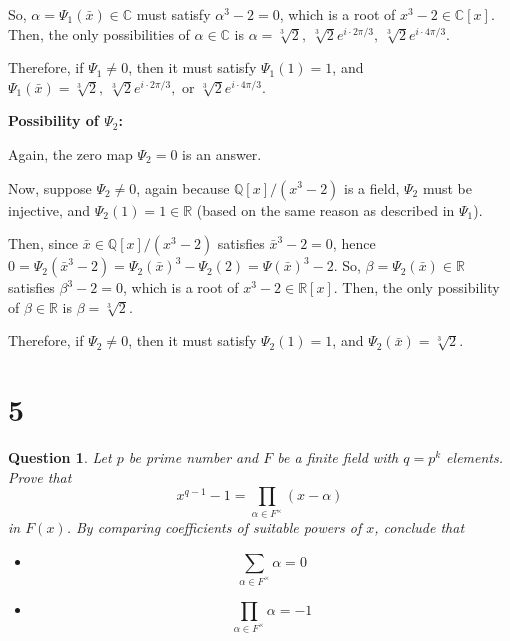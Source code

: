\documentclass{article}
\newtheorem{question}{Question}
\begin{document}
\begin{itemize}
    So, $\alpha=\Psi_1(\bar{x})\in\mathbb{C}$ must satisfy $\alpha^3-2=0$, which is a root of $x^3-2\in\mathbb{C}[x]$. Then, the only possibilities of $\alpha\in \mathbb{C}$ is $\alpha=\sqrt[3]{2},\ \sqrt[3]{2}e^{i\cdot 2\pi/3},\ \sqrt[3]{2}e^{i\cdot 4\pi/3}$.

    Therefore, if $\Psi_1\neq 0$, then it must satisfy $\Psi_1(1)=1$, and $\Psi_1(\bar{x})=\sqrt[3]{2},\ \sqrt[3]{2}e^{i\cdot 2\pi/3},$ or $\sqrt[3]{2}e^{i\cdot 4\pi/3}$.

    \hfil

    \textbf{Possibility of $\Psi_2$:}

    Again, the zero map $\Psi_2=0$ is an answer.

    Now, suppose $\Psi_2\neq 0$, again because $\mathbb{Q}[x]/(x^3-2)$ is a field, $\Psi_2$ must be injective, and $\Psi_2(1)=1\in\mathbb{R}$ (based on the same reason as described in $\Psi_1$).

    Then, since $\bar{x}\in\mathbb{Q}[x]/(x^3-2)$ satisfies $\bar{x}^3-2=0$, hence $0=\Psi_2(\bar{x}^3-2)=\Psi_2(\bar{x})^3-\Psi_2(2)=\Psi(\bar{x})^3-2$.
    So, $\beta=\Psi_2(\bar{x})\in\mathbb{R}$ satisfies $\beta^3-2=0$, which is a root of $x^3-2\in\mathbb{R}[x]$. Then, the only possibility of $\beta\in\mathbb{R}$ is $\beta=\sqrt[3]{2}$.

    Therefore, if $\Psi_2\neq 0$, then it must satisfy $\Psi_2(1)=1$, and $\Psi_2(\bar{x})=\sqrt[3]{2}$.

\end{itemize}

\hfil

\hfil

\section*{5}
\begin{myBox}[]{}
    \begin{question}
        Let $p$ be  prime number and $F$ be a finite field with $q=p^k$ elements. Prove that
        $$x^{q-1}-1=\prod_{\alpha\in F^\times}(x-\alpha)$$
        in $F(x)$. By comparing coefficients of suitable powers of $x$, conclude that
        \begin{itemize}
            \item[(a)]$$\sum_{\alpha\in F^\times}\alpha =0$$
            \item[(b)] $$\prod_{\alpha\in F^{\times}}\alpha=-1$$
        \end{itemize}
    \end{question}
\end{myBox}
\end{document}
